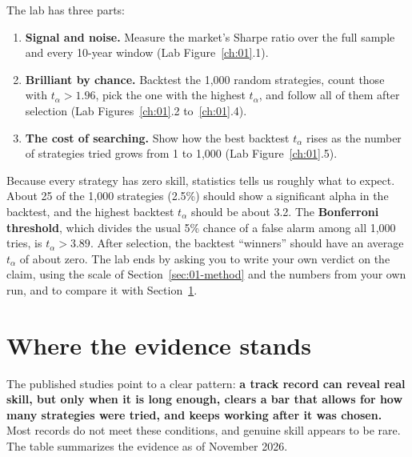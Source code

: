 The lab has three parts:
\begin{enumerate}
  \item \textbf{Signal and noise.} Measure the market's Sharpe ratio over the full sample and every 10-year window (Lab Figure~\ref{ch:01}.1).
  \item \textbf{Brilliant by chance.} Backtest the 1,000 random strategies, count those with $t_\alpha > 1.96$, pick the one with the highest $t_\alpha$, and follow all of them after selection (Lab Figures~\ref{ch:01}.2 to~\ref{ch:01}.4).
  \item \textbf{The cost of searching.} Show how the best backtest $t_\alpha$ rises as the number of strategies tried grows from 1 to 1,000 (Lab Figure~\ref{ch:01}.5).
\end{enumerate}

Because every strategy has zero skill, statistics tells us roughly what to expect. About 25 of the 1,000 strategies (2.5\%) should show a significant alpha in the backtest, and the highest backtest $t_\alpha$ should be about 3.2. The \textbf{Bonferroni threshold}, which divides the usual 5\% chance of a false alarm among all 1,000 tries, is $t_\alpha > 3.89$. After selection, the backtest ``winners'' should have an average $t_\alpha$ of about zero. The lab ends by asking you to write your own verdict on the claim, using the scale of Section~\ref{sec:01-method} and the numbers from your own run, and to compare it with Section~\ref{sec:01-verdict}.

\section{Where the evidence stands}
\label{sec:01-verdict}

The published studies point to a clear pattern: \textbf{a track record can reveal real skill, but only when it is long enough, clears a bar that allows for how many strategies were tried, and keeps working after it was chosen.} Most records do not meet these conditions, and genuine skill appears to be rare. The table summarizes the evidence as of November 2026.

